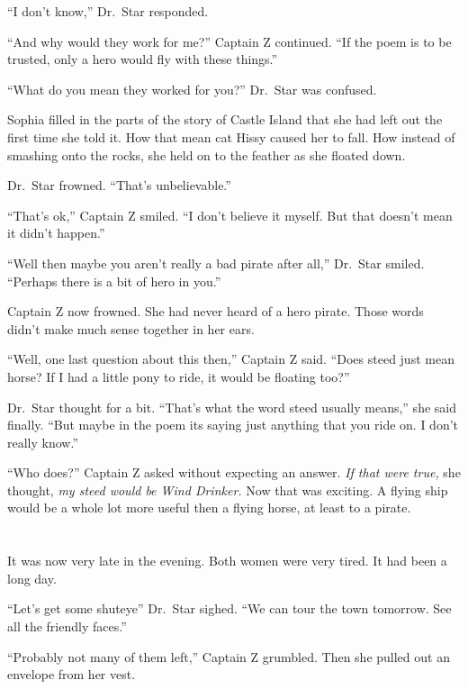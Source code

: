 \documentclass[12pt]{extbook}
\begin{document}
  \enquote{I don't know,} Dr.~Star responded.
  
  \enquote{And why would they work for me?} Captain Z continued.
  \enquote{If the poem is to be trusted, only a hero would fly with these
  things.}
  
  \enquote{What do you mean they worked for you?} Dr.~Star was confused.
  
  Sophia filled in the parts of the story of Castle Island that she had
  left out the first time she told it. How that mean cat Hissy caused her
  to fall. How instead of smashing onto the rocks, she held on to the
  feather as she floated down.
  
  Dr.~Star frowned. \enquote{That's unbelievable.}
  
  \enquote{That's ok,} Captain Z smiled. \enquote{I don't believe it
  myself. But that doesn't mean it didn't happen.}
  
  \enquote{Well then maybe you aren't really a bad pirate after all,}
  Dr.~Star smiled. \enquote{Perhaps there is a bit of hero in you.}
  
  Captain Z now frowned. She had never heard of a hero pirate. Those words
  didn't make much sense together in her ears.
  
  \enquote{Well, one last question about this then,} Captain Z said.
  \enquote{Does steed just mean horse? If I had a little pony to ride, it
  would be floating too?}
  
  Dr.~Star thought for a bit. \enquote{That's what the word steed usually
  means,} she said finally. \enquote{But maybe in the poem its saying just
  anything that you ride on. I don't really know.}
  
  \enquote{Who does?} Captain Z asked without expecting an answer.
  \emph{If that were true,} she thought, \emph{my steed would be Wind
  Drinker.} Now that was exciting. A flying ship would be a whole lot more
  useful then a flying horse, at least to a pirate.
  
  \section{}\label{section-28}
  
  It was now very late in the evening. Both women were very tired. It had
  been a long day.
  
  \enquote{Let's get some shuteye} Dr.~Star sighed. \enquote{We can tour
  the town tomorrow. See all the friendly faces.}
  
  \enquote{Probably not many of them left,} Captain Z grumbled. Then she
  pulled out an envelope from her vest.
  
\end{document}

